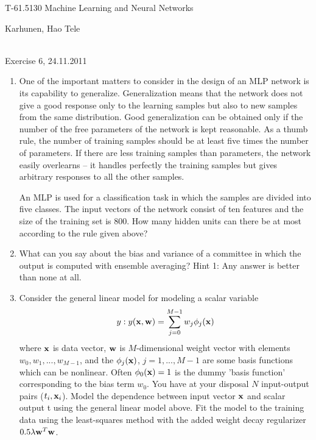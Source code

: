 \documentclass[10pt]{article}
\begin{document}
\pagestyle{empty}
\begin{Large}
\begin{bf} 
T-61.5130 Machine Learning and Neural Networks\\ 
\end{bf}
\end{Large}
Karhunen, Hao Tele\\  
\\
\begin{large}
\begin{bf}
Exercise 6,  24.11.2011
\end{bf}
\end{large}
\begin{enumerate}

\item One of the important matters to consider in the design of an MLP
  network is its capability to generalize. Generalization means that
  the network does not give a good response only to the learning
  samples but also to new samples from the same distribution. Good generalization can be
  obtained only if the number of the free parameters of the network
  is kept reasonable. As a thumb rule, the number of training samples
  should be at least five times the number of parameters. If there are
  less training samples than parameters, the network easily overlearns
  -- it handles perfectly the training samples but gives arbitrary
  responses to all the other samples.

  An MLP is used for a classification task in which the samples are
  divided into five classes. The input vectors of the network consist
  of ten features and the size of the training set is 800. How many
  hidden units can there be at most according to the rule given above?

\vspace{2mm}

\item What can you say about the bias and variance of a committee in
  which the output is computed with ensemble averaging? Hint 1: Any
  answer is better than none at all. 

\vspace{2mm}

\item Consider the general linear model for modeling a scalar variable \[y:
  y({\bf x},{\bf w}) = \sum_{j=0}^{M-1} w_j \phi_j({\bf x})\]
  where ${\bf x}$ is data vector, ${\bf w}$ is $M$-dimensional weight vector with
  elements $w_0,w_1,...,w_{M-1}$, and the $\phi_j({\bf x})$, $j=1,...,M-1$ are
  some basis functions which can be nonlinear. Often $\phi_0({\bf x})
  = 1$ is the dummy 'basis function' corresponding to the bias term $w_0$.
  You have at your disposal $N$ input-output pairs ($t_i,{\bf x}_i$). Model
  the dependence between input vector ${\bf x}$ and scalar output t using the
  general linear model above. Fit the model to the training data using
  the least-squares method with the added weight decay regularizer
  $0.5\lambda {\bf w}^T{\bf w}$.


\end{enumerate}
\end{document}

